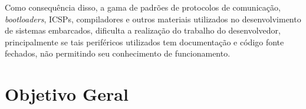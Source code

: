 Como consequência disso, a gama de padrões de protocolos de comunicação, \textit{bootloaders}, ICSPs, compiladores e outros materiais utilizados no desenvolvimento de sistemas embarcados, dificulta a realização do trabalho do desenvolvedor, principalmente se tais periféricos utilizados tem documentação e código fonte fechados, não permitindo seu conhecimento de funcionamento.




\section{Objetivo Geral}


\iffalse
O objetivo geral deve responder as seguintes perguntas:
1) O que a sua organização deseja realizar com o Projeto?
2) Qual problema em especial se quer solucionar?
3) Que mudanças se quer alcançar?
4) Que diferença o projeto quer fazer?

Deve ser escrito em tempo infinitivo (por exemplo: ampliar, capacitar, entre outros) e redigido com claridade. O objetivo precisa ser alcançável, não pode ser genérico, de forma que o projeto não consiga resolver (ex: terminar com a fome no mundo). Por outro lado deve ser ousado, capaz de sinalizar mudanças mais profundas que poderão ser alcançadas pelo projeto a médio e longo prazo.
\fi

